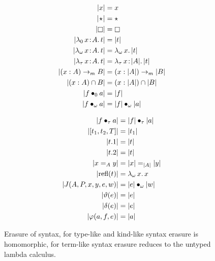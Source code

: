 

\begin{figure}
    \centering
    \begin{minipage}{0.5\textwidth}
        \begin{align*}
            |x| &= x \\
            |\!\star\!| &= \star \\
            |\kind| &= \kind \\
            |\abs{\lambda_0}{x}{A}{t}| &= |t| \\
            |\abs{\lambda_\omega}{x}{A}{t}| &= \absu{\lambda_\omega}{x}{|t|} \\
            |\abs{\lambda_\tau}{x}{A}{t}| &= \abs{\lambda_\tau}{x}{|A|}{|t|} \\
            |(x:A) \to_m B| &= (x:|A|) \to_m |B| \\
            |(x:A) \cap B| &= (x:|A|) \cap |B| \\
            |\app{f}{0}{a}| &= |f| \\
            |\app{f}{\omega}{a}| &= \app{|f|}{\omega}{|a|}
        \end{align*}
    \end{minipage}%
    \begin{minipage}{0.5\textwidth}
        \begin{align*}
            |f \bullet_{\tau} a| &= |f| \bullet_{\tau} |a| \\
            |[t_1, t_2, T]| &= |t_1| \\
            |t.1| &= |t| \\
            |t.2| &= |t| \\
            |x =_A y| &= |x| =_{|A|} |y| \\
            |\text{refl}(t)| &= {\lambda_\omega}\, x.\, x \\
            |J(A, P, x, y, e, w)| &= |e| \bullet_{\omega} |w| \\
            |\vartheta(e)| &= |e| \\
            |\delta(e)| &= |e| \\
            |\varphi(a,f,e)| &= |a|
        \end{align*}
    \end{minipage}
    \caption{Erasure of syntax, for type-like and kind-like syntax erasure is homomorphic, for term-like syntax erasure reduces to the untyped lambda calculus.}
\end{figure}
